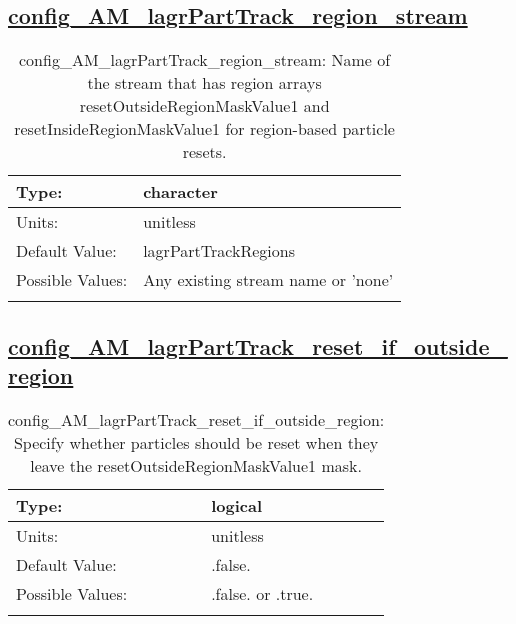 \subsection[config\_AM\_lagrPartTrack\_region\_stream]{\hyperref[sec:nm_tab_AM_lagrPartTrack]{config\_AM\_lagrPartTrack\_region\_stream}}
\label{subsec:nm_sec_config_AM_lagrPartTrack_region_stream}
\begin{center}
\begin{longtable}{| p{2.0in} || p{4.0in} |}
    \hline
    Type: & character \\
    \hline
    Units: & \si{unitless} \\
    \hline
    Default Value: & lagrPartTrackRegions \\
    \hline
    Possible Values: & Any existing stream name or 'none' \\
    \hline
    \caption{config\_AM\_lagrPartTrack\_region\_stream: Name of the stream that has region arrays resetOutsideRegionMaskValue1 and resetInsideRegionMaskValue1 for region-based particle resets.}
\end{longtable}
\end{center}
\subsection[config\_AM\_lagrPartTrack\_reset\_if\_outside\_region]{\hyperref[sec:nm_tab_AM_lagrPartTrack]{config\_AM\_lagrPartTrack\_reset\_if\_outside\_region}}
\label{subsec:nm_sec_config_AM_lagrPartTrack_reset_if_outside_region}
\begin{center}
\begin{longtable}{| p{2.0in} || p{4.0in} |}
    \hline
    Type: & logical \\
    \hline
    Units: & \si{unitless} \\
    \hline
    Default Value: & .false. \\
    \hline
    Possible Values: & .false. or .true. \\
    \hline
    \caption{config\_AM\_lagrPartTrack\_reset\_if\_outside\_region: Specify whether particles should be reset when they leave the resetOutsideRegionMaskValue1 mask.}
\end{longtable}
\end{center}

